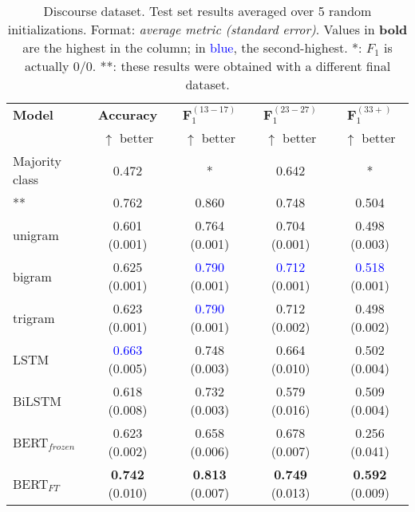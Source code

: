\begin{table*}[h]
    \centering
    \begin{tabular}{l c c c c}
    \toprule
    \textbf{Model} & \textbf{Accuracy} & $\boldsymbol{F}_1^{(13-17)}$ & $\boldsymbol{F}_1^{(23-27)}$ & $\boldsymbol{F}_1^{(33+)}$\\
     & $\uparrow$ better & $\uparrow$ better & $\uparrow$ better & $\uparrow$ better\\
    \midrule
    Majority class
    & 0.472
    & * & 0.642
    & *\\
    \citet{schler2006effects}** & 0.762 & 0.860 & 0.748 & 0.504 \\
    \midrule
    unigram & 0.601 (0.001) & 0.764 (0.001) & 0.704 (0.001) & 0.498 (0.003)\\
    bigram & 0.625 (0.001) & \textcolor{blue}{0.790} (0.001) & \textcolor{blue}{0.712} (0.001) & \textcolor{blue}{0.518} (0.001)\\
    trigram & 0.623 (0.001) & \textcolor{blue}{0.790} (0.001) & 0.712 (0.002) & 0.498 (0.002)\\
    \midrule
    LSTM & \textcolor{blue}{0.663} (0.005) & 0.748 (0.003) & 0.664 (0.010) & 0.502 (0.004) \\
    BiLSTM & 0.618 (0.008) & 0.732 (0.003) & 0.579 (0.016) & 0.509 (0.004)\\
    \midrule
    BERT$_{frozen}$
    & 0.623 (0.002) & 0.658 (0.006) & 0.678 (0.007) & 0.256 (0.041)\\
    BERT$_{FT}$
    & \textbf{0.742} (0.010) & \textbf{0.813} (0.007) & \textbf{0.749} (0.013) & \textbf{0.592} (0.009)\\
    \bottomrule
    \end{tabular}
    \caption{Discourse dataset. Test set results averaged over 5 random initializations. Format: \textit{average metric (standard error)}. Values in \textbf{bold} are the highest in the column; in \textcolor{blue}{blue}, the second-highest. *: $F_1$ is actually $0/0$. **: these results were obtained with a different final dataset.}
    \label{tab:blog_classification}
\end{table*}

